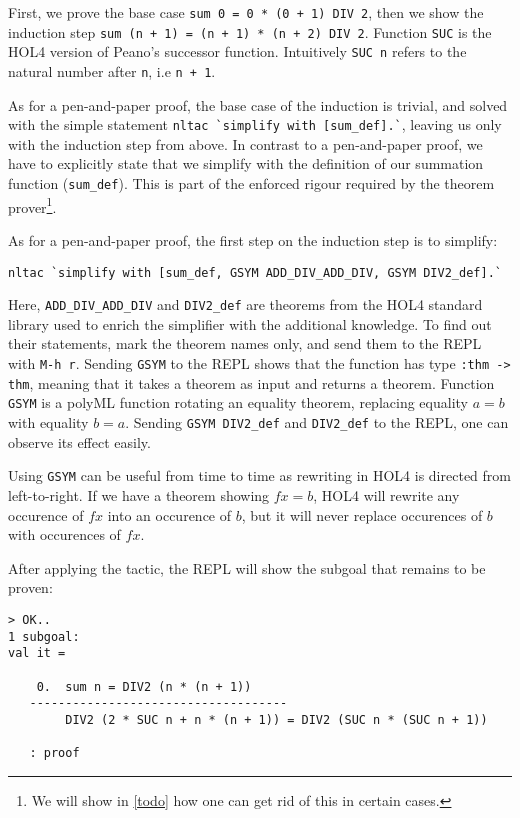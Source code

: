 \documentclass[10pt]{scrartcl}
\newcommand{\ekey}[1]{\texttt{#1}}
\begin{document}
First, we prove the base case \lstinline{sum 0 = 0 * (0 + 1) DIV 2}, then we
show the induction step \lstinline{sum (n + 1) = (n + 1) * (n + 2) DIV 2}.
Function \lstinline{SUC} is the HOL4 version of Peano's successor function.
Intuitively \lstinline{SUC n} refers to the natural number after \lstinline{n},
i.e \lstinline{n + 1}.

As for a pen-and-paper proof, the base case of the induction is trivial, and
solved with the simple statement \lstinline{nltac `simplify with [sum_def].`},
leaving us only with the induction step from above.
In contrast to a pen-and-paper proof, we have to explicitly state that we
simplify with the definition of our summation function (\lstinline{sum_def}).
This is part of the enforced rigour required by the theorem prover\footnote{
We will show in \autoref{todo} how one can get rid of this in certain cases.}.

As for a pen-and-paper proof, the first step on the induction step is to
simplify:
\begin{lstlisting}
nltac `simplify with [sum_def, GSYM ADD_DIV_ADD_DIV, GSYM DIV2_def].`
\end{lstlisting}

Here, \lstinline{ADD_DIV_ADD_DIV} and \lstinline{DIV2_def} are theorems from the
HOL4 standard library used to enrich the simplifier with the additional
knowledge.
To find out their statements, mark the theorem names only, and send them to the
REPL with \ekey{M-h r}.
Sending \lstinline{GSYM} to the REPL shows that the function has type
\lstinline{:thm -> thm}, meaning that it takes a theorem as input and returns a
theorem.
Function \lstinline{GSYM} is a polyML function rotating an equality theorem,
replacing equality $a = b$ with equality $b = a$.
Sending \lstinline{GSYM DIV2_def} and \lstinline{DIV2_def} to the REPL, one can
observe its effect easily.

Using \lstinline{GSYM} can be useful from time to time as rewriting in HOL4 is
directed from left-to-right.
If we have a theorem showing $f x = b$, HOL4 will rewrite any occurence of
$f x$ into an occurence of $b$, but it will never replace occurences of $b$
with occurences of $f x$.

After applying the tactic, the REPL will show the subgoal that remains to be proven:
\begin{lstlisting}
> OK..
1 subgoal:
val it =

    0.  sum n = DIV2 (n * (n + 1))
   ------------------------------------
        DIV2 (2 * SUC n + n * (n + 1)) = DIV2 (SUC n * (SUC n + 1))

   : proof
\end{lstlisting}
\end{document}

